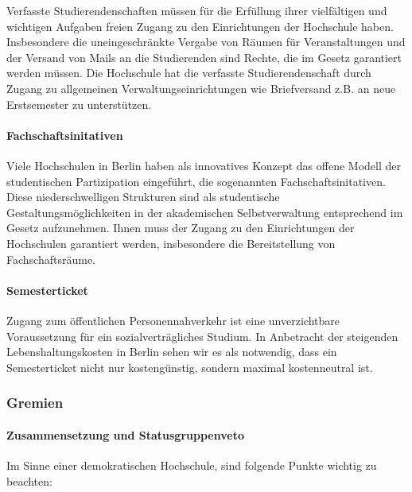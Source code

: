 Verfasste Studierendenschaften müssen für die Erfüllung ihrer
vielfältigen und wichtigen Aufgaben freien Zugang zu den Einrichtungen
der Hochschule haben. Insbesondere die uneingeschränkte Vergabe von
Räumen für Veranstaltungen und der Versand von Mails an die Studierenden
sind Rechte, die im Gesetz garantiert werden müssen. Die Hochschule hat
die verfasste Studierendenschaft durch Zugang zu allgemeinen
Verwaltungseinrichtungen wie Briefversand z.B. an neue Erstsemester zu
unterstützen.

\hypertarget{fachschaftsinitativen}{%
\paragraph{Fachschaftsinitativen}\label{fachschaftsinitativen}}

Viele Hochschulen in Berlin haben als innovatives Konzept das offene
Modell der studentischen Partizipation eingeführt, die sogenannten
Fachschaftsinitativen. Diese niederschwelligen Strukturen sind als
studentische Gestaltungsmöglichkeiten in der akademischen
Selbstverwaltung entsprechend im Gesetz aufzunehmen. Ihnen muss der
Zugang zu den Einrichtungen der Hochschulen garantiert werden,
insbesondere die Bereitstellung von Fachschaftsräume.

\hypertarget{semesterticket}{%
\paragraph{Semesterticket}\label{semesterticket}}

Zugang zum öffentlichen Personennahverkehr ist eine unverzichtbare
Voraussetzung für ein sozialverträgliches Studium. In Anbetracht der
steigenden Lebenshaltungskosten in Berlin sehen wir es als notwendig,
dass ein Semesterticket nicht nur kostengünstig, sondern maximal
kostenneutral ist.

\hypertarget{gremien}{%
\subsubsection{Gremien}\label{gremien}}

\hypertarget{zusammensetzung-und-statusgruppenveto}{%
\paragraph{Zusammensetzung und
Statusgruppenveto}\label{zusammensetzung-und-statusgruppenveto}}

Im Sinne einer demokratischen Hochschule, sind folgende Punkte wichtig
zu beachten:

